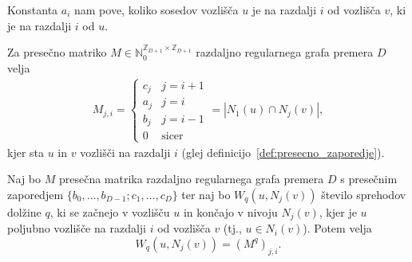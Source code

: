 \documentclass[fin1, tisk]{fmfdelo}
\begin{document}
\begin{opomba}
    Konstanta $a_i$ nam pove, koliko sosedov vozlišča $u$ je na razdalji $i$ od vozlišča $v$, ki je na razdalji $i$ od $u$.
\end{opomba}
\begin{opomba}
    Za presečno matriko $M \in \mathbb{N}_0^{\mathbb{Z}_{D+1}\times \mathbb{Z}_{D+1}}$ razdaljno regularnega grafa premera $D$ velja 
    \begin{align}
    M_{j, i} = \begin{cases}
        c_j & j = i + 1 \\
        a_j & j = i \\
        b_j & j = i - 1 \\
        0 & \text{sicer}
    \end{cases} = |N_1(u)\cap N_j(v)|,
    \end{align}
    kjer sta $u$ in $v$ vozlišči na razdalji $i$ (glej definicijo~\ref{def:presecno_zaporedje}).
\end{opomba}

\begin{trditev}\label{tr:eta_presecna}
    Naj bo $M$ presečna matrika razdaljno regularnega grafa premera $D$ s presečnim zaporedjem $\{b_0, \ldots, b_{D-1}; c_1, \ldots, c_D\}$
    ter naj bo $W_q(u, N_j(v))$ število sprehodov dolžine $q$, ki se začnejo v vozlišču $u$ in končajo v nivoju $N_j(v)$,
    kjer je $u$ poljubno vozlišče na razdalji $i$ od vozlišča $v$ (tj., $u\in N_i(v)$).
    Potem velja
    $$W_q(u, N_j(v)) = (M^q)_{j, i}.$$
\end{trditev}
\end{document}

